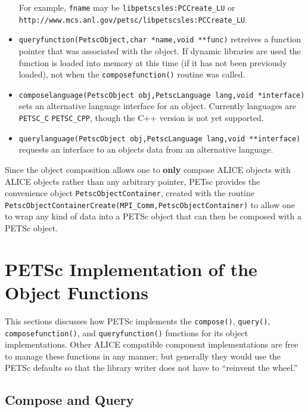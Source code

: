 \documentclass[twoside,12pt]{../sty/report_petsc}
\begin{document}
\begin{itemize}
      For example, {\tt fname} may be {\tt libpetscsles:PCCreate\_LU} or 
      {\tt http://www.mcs.anl.gov/petsc/libpetscsles:PCCreate\_LU}.

\item {\tt queryfunction(PetscObject,char *name,void **func)} retreives a function pointer that
      was associated with the object. If dynamic libraries are used the function is loaded
      into memory at this time (if it has not been previously loaded), not when the
      {\tt composefunction()} routine was called.

\item {\tt composelanguage(PetscObject obj,PetscLanguage lang,void *interface)} sets an
      alternative language interface for an object. Currently languages are {\tt PETSC\_C}
      {\tt PETSC\_CPP}, though the C++ version is not yet supported.

\item {\tt querylanguage(PetscObject obj,PetscLanguage lang,void **interface)} requests
      an interface to an objects data from an alternative language.

\end{itemize}

Since the object composition allows one to {\bf only} compose ALICE objects
with ALICE objects rather than any arbitrary pointer, PETsc provides
the convenience object {\tt PetscObjectContainer}, created with the
routine {\tt PetscObjectContainerCreate(MPI\_Comm,PetscObjectContainer)}
to allow one to wrap any kind of data into a PETSc object that can then be
composed with a PETSc object.

\section{PETSc Implementation of the  Object Functions}

This sections discusses how PETSc implements the {\tt compose()}, {\tt query()}, {\tt
composefunction()}, and {\tt queryfunction()} functions for its object implementations. 
Other ALICE compatible component implementations are free to manage these functions in any 
manner; but generally they would use the PETSc defaults so that the library writer does
not have to ``reinvent the wheel.''

\subsection{Compose and Query}
\end{document}
